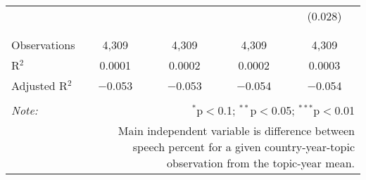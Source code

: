\begin{table}[!htbp]
\begin{tabular}{@{\extracolsep{5pt}}lcccc}
  &  &  &  & (0.028) \\ 
  & & & & \\ 
\hline \\[-1.8ex] 
Observations & 4,309 & 4,309 & 4,309 & 4,309 \\ 
R$^{2}$ & 0.0001 & 0.0002 & 0.0002 & 0.0003 \\ 
Adjusted R$^{2}$ & $-$0.053 & $-$0.053 & $-$0.054 & $-$0.054 \\ 
\hline 
\hline \\[-1.8ex] 
\textit{Note:}  & \multicolumn{4}{r}{$^{*}$p$<$0.1; $^{**}$p$<$0.05; $^{***}$p$<$0.01} \\ 
 & \multicolumn{4}{r}{Main independent variable is difference between speech percent for a given country-year-topic observation from the topic-year mean.} \\ 
\end{tabular} 
\end{table} 
